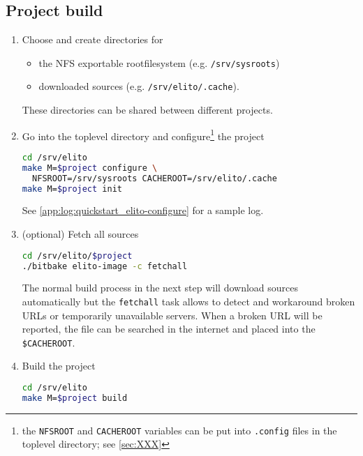 \subsection{Project build}
\label{subsec:quickstart_project-build}

\begin{enumerate}[resume]
\item Choose and create directories for
  \begin{itemize}
  \item the NFS exportable rootfilesystem (e.g. \texttt{/srv/sysroots})
  \item downloaded sources (e.g. \texttt{/srv/elito/.cache}).
  \end{itemize}

  These directories can be shared between different projects.

\item Go into the toplevel directory and configure\footnote{the
    \texttt{NFSROOT} and \texttt{CACHEROOT} variables can be put into
    \texttt{.config} files in the toplevel directory; see
    \autoref{sec:XXX}} the project %
\begin{lstlisting}[language=bash]
cd /srv/elito
make M=$project configure \
  NFSROOT=/srv/sysroots CACHEROOT=/srv/elito/.cache
make M=$project init
\end{lstlisting}

  See \autoref{app:log:quickstart_elito-configure} for a sample log.

\item (optional) Fetch all sources
\begin{lstlisting}[language=bash]
cd /srv/elito/$project
./bitbake elito-image -c fetchall
\end{lstlisting}

  The normal build process in the next step will download sources
  automatically but the \texttt{fetchall} task allows to detect and
  workaround broken URLs or temporarily unavailable servers.  When a
  broken URL will be reported, the file can be searched in the
  internet and placed into the \texttt{\$CACHEROOT}.
\item Build the project
\begin{lstlisting}[language=bash]
cd /srv/elito
make M=$project build
\end{lstlisting}

\end{enumerate}

